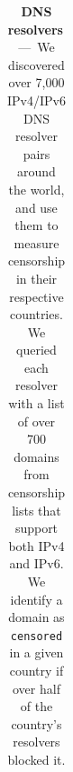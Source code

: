 {\begin{table}[ht]
\begin{tabular}{c|cc}
            \toprule
        \end{tabular}
        \caption{\textbf{DNS resolvers}\,---\,%
            We discovered over 7,000 IPv4/IPv6 DNS resolver pairs around the world, and
            use them to measure censorship in their respective countries.
            We queried each resolver with a list of over 700 domains from censorship
            lists that support both IPv4 and IPv6. We identify a domain as \texttt{censored}
            in a given country if over half of the country's resolvers blocked it.
            }
        \label{tab:country-resolvers}
    \end{table}
}

